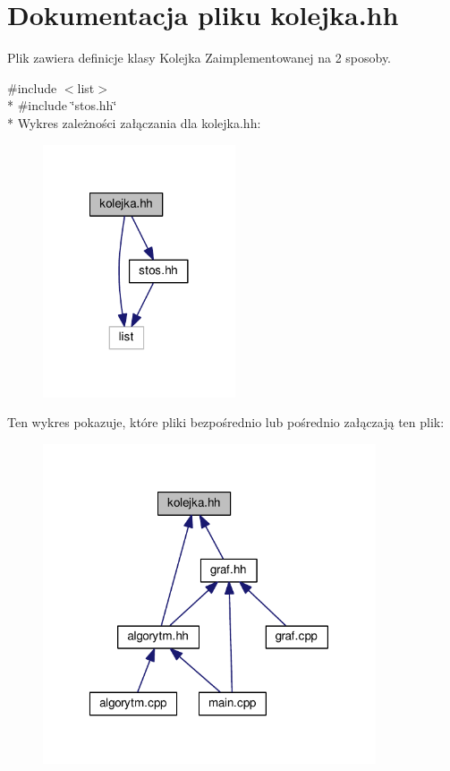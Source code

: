 \hypertarget{kolejka_8hh}{\section{Dokumentacja pliku kolejka.\-hh}
\label{kolejka_8hh}
}


Plik zawiera definicje klasy Kolejka Zaimplementowanej na 2 sposoby.  


{\ttfamily \#include $<$list$>$}\\*
{\ttfamily \#include \char`\"{}stos.\-hh\char`\"{}}\\*
Wykres zależności załączania dla kolejka.\-hh\-:\nopagebreak
\begin{figure}[H]
\begin{center}
\leavevmode
\includegraphics[width=161pt]{kolejka_8hh__incl}
\end{center}
\end{figure}
Ten wykres pokazuje, które pliki bezpośrednio lub pośrednio załączają ten plik\-:\nopagebreak
\begin{figure}[H]
\begin{center}
\leavevmode
\includegraphics[width=279pt]{kolejka_8hh__dep__incl}
\end{center}
\end{figure}
